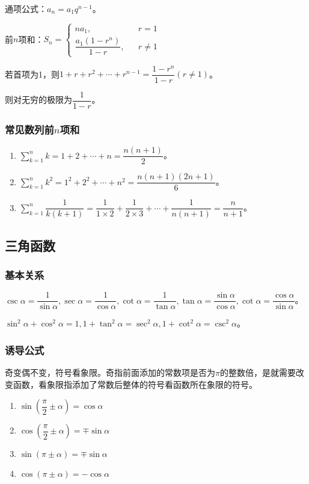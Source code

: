 \documentclass[UTF8, 12pt]{ctexart}
\begin{document}
通项公式：$a_n=a_1q^{n-1}$。

前$n$项和：$S_n=
    \left\{
    \begin{array}{lcl}
        na_1,                   &  & r=1     \\
        \dfrac{a_1(1-r^n)}{1-r}, &  & r\neq 1
    \end{array}
    \right.$

若首项为1，则$1+r+r^2+\cdots+r^{n-1}=\dfrac{1-r^n}{1-r}(r\neq 1)$。

则对无穷的极限为$\dfrac{1}{1-r}$。

\subsubsection{常见数列前$n$项和}

\begin{enumerate}
    \item $\sum_{k=1}^nk=1+2+\cdots+n=\dfrac{n(n+1)}{2}$。
    \item $\sum_{k=1}^nk^2=1^2+2^2+\cdots+n^2=\dfrac{n(n+1)(2n+1)}{6}$。
    \item $\sum_{k=1}^n\dfrac{1}{k(k+1)}=\dfrac{1}{1\times 2}+\dfrac{1}{2\times 3}+\cdots+\dfrac{1}{n(n+1)}=\dfrac{n}{n+1}$。
\end{enumerate}

\subsection{三角函数}

\subsubsection{基本关系}

$\csc\alpha=\dfrac{1}{\sin\alpha},\sec\alpha=\dfrac{1}{\cos\alpha},\cot\alpha=\dfrac{1}{\tan\alpha},\tan\alpha=\dfrac{\sin\alpha}{\cos\alpha},\cot\alpha=\dfrac{\cos\alpha}{\sin\alpha}$。

$\sin^2\alpha+\cos^2\alpha=1,1+\tan^2\alpha=\sec^2\alpha,1+\cot^2\alpha=\csc^2\alpha$。

\subsubsection{诱导公式}

奇变偶不变，符号看象限。奇指前面添加的常数项是否为$\pi$的整数倍，是就需要改变函数，看象限指添加了常数后整体的符号看函数所在象限的符号。

\begin{enumerate}
    \item $\sin(\dfrac{\pi}{2}\pm\alpha)=\cos\alpha$
    \item $\cos(\dfrac{\pi}{2}\pm\alpha)=\mp\sin\alpha$
    \item $\sin(\pi\pm\alpha)=\mp\sin\alpha$
    \item $\cos(\pi\pm\alpha)=-\cos\alpha$
\end{enumerate}
\end{document}
